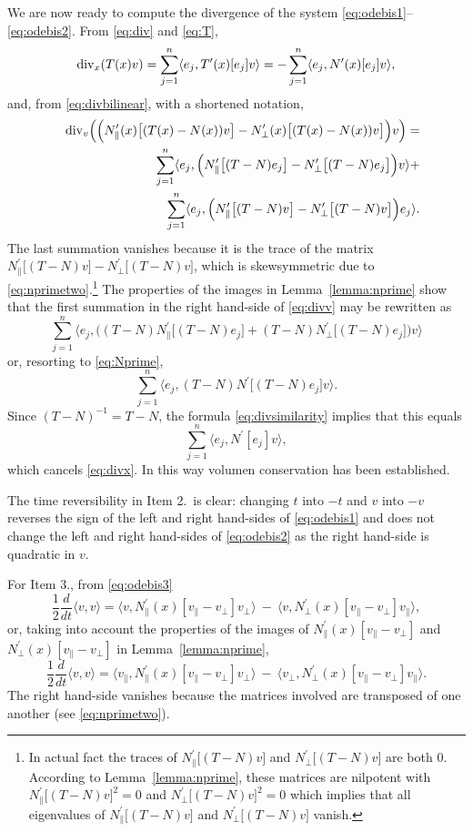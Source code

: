 \documentclass[10pt]{article}
\newcommand{\Npperp}{N^\prime_\perp}
\newcommand{\Nppar}{N^\prime_\|}
\newcommand{\vperp}{v_\perp}
\newcommand{\vpar}{v_\|}
\begin{document}
We are now ready to compute the divergence of the system \eqref{eq:odebis1}--\eqref{eq:odebis2}.
From \eqref{eq:div} and \eqref{eq:T},
\begin{equation}\label{eq:divx}
{\rm div}_x (T(x)v )= \sum_{j=1}^n \langle e_j,T^\prime(x)[e_j]v\rangle= -\sum_{j=1}^n \langle e_j,N^\prime(x)[e_j]v\rangle,
\end{equation}
and, from \eqref{eq:divbilinear}, with a shortened notation,
\begin{eqnarray}
\nonumber
&&{\rm div}_v \Big(\Big(\Nppar(x)\big[(T(x)-N(x))v\big]-\Npperp(x)\big[(T(x)-N(x))v\big]\Big)v\Big)  = \\
%
\nonumber
&&\qquad\qquad \sum_{j=1}^n \langle e_j, \Big(\Nppar\big[(T-N)e_j\big]-\Npperp\big[(T-N)e_j\big]\Big)v\rangle+\\
%
\label{eq:divv}
&& \qquad\qquad \sum_{j=1}^n \langle e_j, \Big(\Nppar\big[(T-N)v\big]-\Npperp\big[(T-N)v\big]\Big)e_j\rangle.
\end{eqnarray}
The last summation vanishes because it is the trace of the matrix \(\Nppar\big[(T-N)v\big]-\Npperp\big[(T-N)v\big]\), which is skewsymmetric due to \eqref{eq:nprimetwo}.\footnote{In actual fact the traces of \(\Nppar\big[(T-N)v\big]\) and \(\Npperp\big[(T-N)v\big]\) are both \(0\). According to Lemma~\ref{lemma:nprime}, these matrices are nilpotent with \(\Nppar\big[(T-N)v\big]^2=0\) and \(\Npperp\big[(T-N)v\big]^2 = 0\) which implies that all eigenvalues of \(\Nppar\big[(T-N)v\big]\) and \(\Npperp\big[(T-N)v\big]\) vanish.  } The properties of the images in Lemma~\ref{lemma:nprime} show that the first summation in the right hand-side of \eqref{eq:divv} may be rewritten as
\[
\sum_{j=1}^n \langle e_j, \Big((T-N)\Nppar\big[(T-N)e_j\big]+(T-N)\Npperp\big[(T-N)e_j\big]\Big)v\rangle
\]
or, resorting to \eqref{eq:Nprime},
\[
\sum_{j=1}^n \langle e_j, (T-N)N^\prime\big[(T-N)e_j\big]v\rangle.
\]
Since \((T-N)^{-1} = T-N\), the formula \eqref{eq:divsimilarity} implies that this equals
\[
\sum_{j=1}^n \langle e_j, N^\prime[e_j]v\rangle,
\]
which cancels \eqref{eq:divx}. In this way volumen conservation has been established.

 The time reversibility in Item 2.\ is clear:
changing \(t\) into \(-t\) and \(v\) into \(-v\) reverses the sign of the left and right hand-sides of \eqref{eq:odebis1} and does not change
the left and right hand-sides of \eqref{eq:odebis2} as the right hand-side is quadratic in \(v\).

For Item 3., from \eqref{eq:odebis3}
\[
\frac{1}{2} \frac{d}{dt}\langle v,v\rangle = \langle v, \Nppar(x)[\vpar-\vperp]\vperp\rangle\:-\:\langle v,\Npperp(x)[\vpar-\vperp]\vpar\rangle,
\]
or, taking into account the properties of the images of \(\Nppar(x)[\vpar-\vperp]\) and \(\Npperp(x)[\vpar-\vperp]\) in Lemma~\ref{lemma:nprime},
\[
\frac{1}{2}\frac{d}{dt} \langle v,v\rangle = \langle \vpar, \Nppar(x)[\vpar-\vperp]\vperp\rangle\:-\:\langle \vperp,\Npperp(x)[\vpar-\vperp]\vpar\rangle.
\]
The right hand-side vanishes because the matrices involved are transposed of one another (see \eqref{eq:nprimetwo}).
\end{document}
